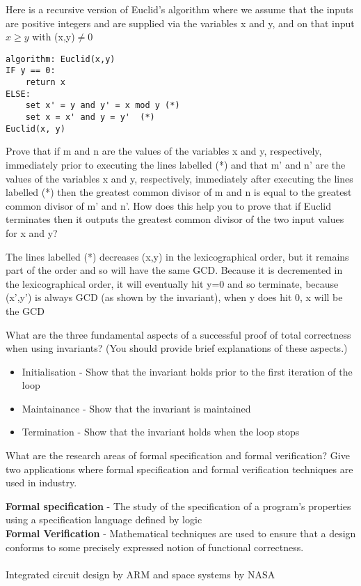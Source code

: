 \documentclass[addpoints]{exam}
\begin{document}
\begin{questions}
\question[8]
Here is a recursive version of Euclid's algorithm where we assume that the inputs are positive integers and are supplied via the variables x and y, and on that input $x\geq y$ with (x,y)$\neq 0$
\begin{lstlisting}
algorithm: Euclid(x,y)
IF y == 0:
	return x
ELSE:
	set x' = y and y' = x mod y (*)
	set x = x' and y = y'  (*)
Euclid(x, y)
\end{lstlisting}
Prove that if m and n are the values of the variables x and y, respectively, immediately prior to executing the lines labelled (*) and that m' and n' are the values of the variables x and y, respectively, immediately
after executing the lines labelled (*) then the greatest common divisor
of m and n is equal to the greatest common divisor of m' and n'. How does this help you to prove that if Euclid terminates then it outputs the greatest common divisor of the two input values for x and y?
\begin{solution}[2in]
	The lines labelled (*) decreases (x,y) in the lexicographical order, but it remains part of the order and so will have the same GCD. Because it is decremented in the lexicographical order, it will eventually hit y=0 and so terminate, because (x',y') is always GCD (as shown by the invariant), when y does hit 0, x will be the GCD
\end{solution}

\question[3]What are the three fundamental aspects of a successful proof of total
correctness when using invariants? (You should provide brief explanations of these aspects.)
\begin{solution}[2in]
\begin{itemize}
	\item Initialisation - Show that the invariant holds prior to the first iteration of the loop
	\item Maintainance - Show that the invariant is maintained
	\item Termination - Show that the invariant holds when the loop stops
\end{itemize}
\end{solution}

\question[4]What are the research areas of formal specification and formal verification? Give two applications where formal specification and formal
verification techniques are used in industry.
\begin{solution}[2in]
	\textbf{Formal specification} - The study of the specification of a program's properties using a specification language defined by logic\\
	\textbf{Formal Verification} - Mathematical techniques are used to ensure that a design conforms to some precisely expressed notion of functional correctness.\\
	\\
	Integrated circuit design by ARM and space systems by NASA
\end{solution}

\end{questions}

	
	
	
	
\end{document}
